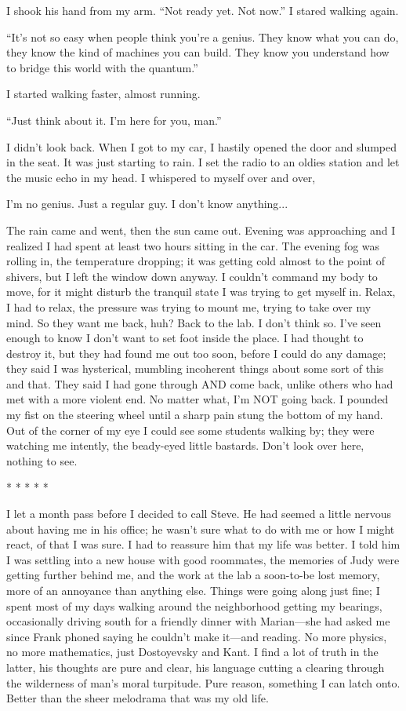 \documentclass[
]{article}
\begin{document}
I shook his hand from my arm. ``Not ready yet. Not now.'' I stared
walking again.

``It's not so easy when people think you're a genius. They know what you
can do, they know the kind of machines you can build. They know you
understand how to bridge this world with the quantum.''

I started walking faster, almost running.

``Just think about it. I'm here for you, man.''

I didn't look back. When I got to my car, I hastily opened the door and
slumped in the seat. It was just starting to rain. I set the radio to an
oldies station and let the music echo in my head. I whispered to myself
over and over,

I'm no genius. Just a regular guy. I don't know anything...

The rain came and went, then the sun came out. Evening was approaching
and I realized I had spent at least two hours sitting in the car. The
evening fog was rolling in, the temperature dropping; it was getting
cold almost to the point of shivers, but I left the window down anyway.
I couldn't command my body to move, for it might disturb the tranquil
state I was trying to get myself in. Relax, I had to relax, the pressure
was trying to mount me, trying to take over my mind. So they want me
back, huh? Back to the lab. I don't think so. I've seen enough to know I
don't want to set foot inside the place. I had thought to destroy it,
but they had found me out too soon, before I could do any damage; they
said I was hysterical, mumbling incoherent things about some sort of
this and that. They said I had gone through AND come back, unlike others
who had met with a more violent end. No matter what, I'm NOT going back.
I pounded my fist on the steering wheel until a sharp pain stung the
bottom of my hand. Out of the corner of my eye I could see some students
walking by; they were watching me intently, the beady-eyed little
bastards. Don't look over here, nothing to see.

* * * * *

I let a month pass before I decided to call Steve. He had seemed a
little nervous about having me in his office; he wasn't sure what to do
with me or how I might react, of that I was sure. I had to reassure him
that my life was better. I told him I was settling into a new house with
good roommates, the memories of Judy were getting further behind me, and
the work at the lab a soon-to-be lost memory, more of an annoyance than
anything else. Things were going along just fine; I spent most of my
days walking around the neighborhood getting my bearings, occasionally
driving south for a friendly dinner with Marian---she had asked me since
Frank phoned saying he couldn't make it---and reading. No more physics,
no more mathematics, just Dostoyevsky and Kant. I find a lot of truth in
the latter, his thoughts are pure and clear, his language cutting a
clearing through the wilderness of man's moral turpitude. Pure reason,
something I can latch onto. Better than the sheer melodrama that was my
old life.
\end{document}
